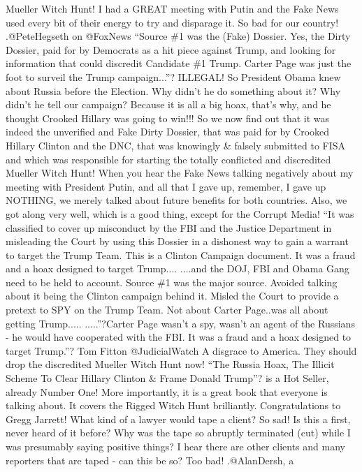Mueller Witch Hunt! I had a GREAT meeting with Putin and the Fake News
used every bit of their energy to try and disparage it. So bad for our
country! .@PeteHegseth on @FoxNews ``Source \#1 was the (Fake) Dossier.
Yes, the Dirty Dossier, paid for by Democrats as a hit piece against
Trump, and looking for information that could discredit Candidate \#1
Trump. Carter Page was just the foot to surveil the Trump campaign...''?
ILLEGAL! So President Obama knew about Russia before the Election. Why
didn't he do something about it? Why didn't he tell our campaign?
Because it is all a big hoax, that's why, and he thought Crooked Hillary
was going to win!!! So we now find out that it was indeed the unverified
and Fake Dirty Dossier, that was paid for by Crooked Hillary Clinton and
the DNC, that was knowingly \& falsely submitted to FISA and which was
responsible for starting the totally conflicted and discredited Mueller
Witch Hunt! When you hear the Fake News talking negatively about my
meeting with President Putin, and all that I gave up, remember, I gave
up NOTHING, we merely talked about future benefits for both countries.
Also, we got along very well, which is a good thing, except for the
Corrupt Media! ``It was classified to cover up misconduct by the FBI and
the Justice Department in misleading the Court by using this Dossier in
a dishonest way to gain a warrant to target the Trump Team. This is a
Clinton Campaign document. It was a fraud and a hoax designed to target
Trump.... ....and the DOJ, FBI and Obama Gang need to be held to
account. Source \#1 was the major source. Avoided talking about it being
the Clinton campaign behind it. Misled the Court to provide a pretext to
SPY on the Trump Team. Not about Carter Page..was all about getting
Trump..... .....''?Carter Page wasn't a spy, wasn't an agent of the
Russians - he would have cooperated with the FBI. It was a fraud and a
hoax designed to target Trump.''? Tom Fitton @JudicialWatch A disgrace
to America. They should drop the discredited Mueller Witch Hunt now!
``The Russia Hoax, The Illicit Scheme To Clear Hillary Clinton \& Frame
Donald Trump''? is a Hot Seller, already Number One! More importantly,
it is a great book that everyone is talking about. It covers the Rigged
Witch Hunt brilliantly. Congratulations to Gregg Jarrett! What kind of a
lawyer would tape a client? So sad! Is this a first, never heard of it
before? Why was the tape so abruptly terminated (cut) while I was
presumably saying positive things? I hear there are other clients and
many reporters that are taped - can this be so? Too bad! .@AlanDersh, a
